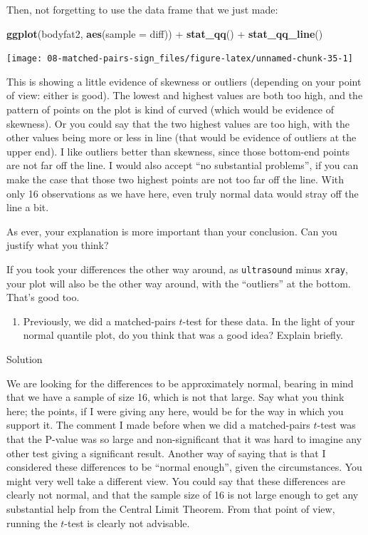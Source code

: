 \documentclass[]{tufte-book}
\newenvironment{Shaded}{}{}
\newcommand{\DataTypeTok}[1]{\textcolor[rgb]{0.56,0.13,0.00}{#1}}
\newcommand{\KeywordTok}[1]{\textcolor[rgb]{0.00,0.44,0.13}{\textbf{#1}}}
\newcommand{\NormalTok}[1]{#1}
\newcommand{\OperatorTok}[1]{\textcolor[rgb]{0.40,0.40,0.40}{#1}}
\newcommand{\StringTok}[1]{\textcolor[rgb]{0.25,0.44,0.63}{#1}}
\providecommand{\tightlist}{%
  \setlength{\itemsep}{0pt}\setlength{\parskip}{0pt}}
\theoremstyle{definition}
\theoremstyle{definition}
\theoremstyle{definition}
\theoremstyle{remark}
\begin{document}
Then, not forgetting to use the data frame that we just made:

\begin{Shaded}
\begin{Highlighting}[]
\KeywordTok{ggplot}\NormalTok{(bodyfat2, }\KeywordTok{aes}\NormalTok{(}\DataTypeTok{sample =}\NormalTok{ diff)) }\OperatorTok{+}\StringTok{ }\KeywordTok{stat_qq}\NormalTok{() }\OperatorTok{+}\StringTok{ }
\StringTok{    }\KeywordTok{stat_qq_line}\NormalTok{()}
\end{Highlighting}
\end{Shaded}

\texttt{[image: 08-matched-pairs-sign\_files/figure-latex/unnamed-chunk-35-1]}

This is showing a little evidence of skewness or outliers (depending on
your point of view: either is good). The lowest and highest values are
both too high, and the pattern of points on the plot is kind of curved
(which would be evidence of skewness). Or you could say that the two
highest values are too high, with the other values being more or less in
line (that would be evidence of outliers at the upper end). I like
outliers better than skewness, since those bottom-end points are not far
off the line. I would also accept ``no substantial problems'', if you
can make the case that those two highest points are not too far off the
line. With only 16 observations as we have here, even truly normal data
would stray off the line a bit.

As ever, your explanation is more important than your conclusion. Can
you justify what you think?

If you took your differences the other way around, as
\texttt{ultrasound} minus \texttt{xray}, your plot will also be the
other way around, with the ``outliers'' at the bottom. That's good too.

\begin{enumerate}
\def\labelenumi{(\alph{enumi})}
\setcounter{enumi}{2}
\tightlist
\item
  Previously, we did a matched-pairs \(t\)-test for these data. In the
  light of your normal quantile plot, do you think that was a good idea?
  Explain briefly.
\end{enumerate}

Solution

We are looking for the differences to be approximately normal, bearing
in mind that we have a sample of size 16, which is not that large. Say
what you think here; the points, if I were giving any here, would be for
the way in which you support it. The comment I made before when we did a
matched-pairs \(t\)-test was that the P-value was so large and
non-significant that it was hard to imagine any other test giving a
significant result. Another way of saying that is that I considered
these differences to be ``normal enough'', given the circumstances. You
might very well take a different view. You could say that these
differences are clearly not normal, and that the sample size of 16 is
not large enough to get any substantial help from the Central Limit
Theorem. From that point of view, running the \(t\)-test is clearly not
advisable.
\end{document}
